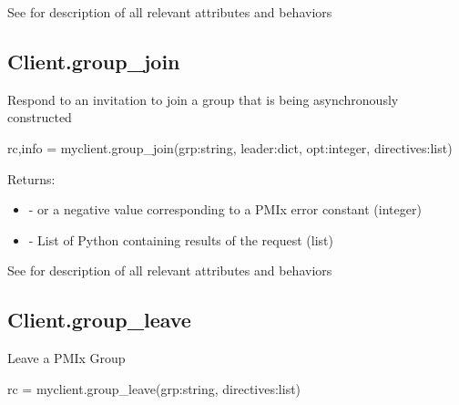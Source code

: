 See  for description of all relevant attributes and behaviors


\subsection{Client.group_join}

\summary

Respond to an invitation to join a group that is being asynchronously constructed

\format

\pyspecificstart
\begin{codepar}
rc,info = myclient.group_join(grp:string, leader:dict, opt:integer, directives:list)
\end{codepar}
\pyspecificend

\begin{arglist}
\end{arglist}

Returns:

\begin{itemize}
    \item {} -  or a negative value corresponding to a PMIx error constant (integer)
    \item {} - List of Python  containing results of the request (list)
\end{itemize}


See  for description of all relevant attributes and behaviors


\subsection{Client.group_leave}

\summary

Leave a PMIx Group

\format

\pyspecificstart
\begin{codepar}
rc = myclient.group_leave(grp:string, directives:list)
\end{codepar}
\pyspecificend

